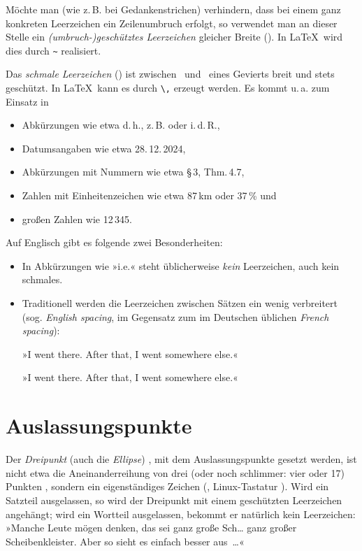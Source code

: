 Möchte man (wie z.\,B. bei Gedankenstrichen) verhindern, dass bei einem
ganz konkreten Leerzeichen ein Zeilenumbruch erfolgt, so verwendet man an dieser
Stelle ein \emph{(umbruch-)geschütztes Leerzeichen} gleicher Breite
(). In \LaTeX\ wird dies durch \verb!~! realisiert.

Das \emph{schmale Leerzeichen} () ist zwischen \ und
\ eines Gevierts breit und stets geschützt. In \LaTeX\ kann
es durch \verb!\,! erzeugt werden. Es kommt u.\,a. zum Einsatz in
\begin{itemize}
\item Abkürzungen wie etwa d.\,h., z.\,B. oder i.\,d.\,R.,
\item Datumsangaben wie etwa 28.\,12.\,2024,
\item Abkürzungen mit Nummern wie etwa §\,3, Thm.\,4.7,
\item Zahlen mit Einheitenzeichen wie etwa 87\,km oder 37\,\% und
\item großen Zahlen wie 12\,345.
\end{itemize}

Auf Englisch gibt es folgende zwei Besonderheiten:
\begin{itemize}
\item In Abkürzungen wie »\foreignlanguage{british}{i.e.}« steht
  üblicherweise \emph{kein} Leerzeichen, auch kein schmales.
\item Traditionell werden die Leerzeichen zwischen Sätzen ein wenig
  verbreitert (sog. \emph{\foreignlanguage{british}{English spacing}},
  im Gegensatz zum im Deutschen üblichen
  \emph{\foreignlanguage{british}{French spacing}}):

  »\foreignlanguage{british}{I went there.  After that, I went
    somewhere else.}«

  »\foreignlanguage{british}{\frenchspacing I went there.  After that,
    I went somewhere else.}«
\end{itemize}


\section{Auslassungspunkte}

Der \emph{Dreipunkt} (auch die \emph{Ellipse}) , mit dem
Auslassungspunkte gesetzt werden, ist nicht etwa die Aneinanderreihung
von drei (oder noch schlimmer: vier oder 17) Punkten ,
sondern ein eigenständiges Zeichen (, Linux-Tastatur
).  Wird ein Satzteil ausgelassen, so wird der
Dreipunkt mit einem geschützten Leerzeichen angehängt; wird ein
Wortteil ausgelassen, bekommt er natürlich kein Leerzeichen: »Manche
Leute mögen denken, das sei ganz große Sch… ganz großer
Scheibenkleister.  Aber so sieht es einfach besser aus~…«

